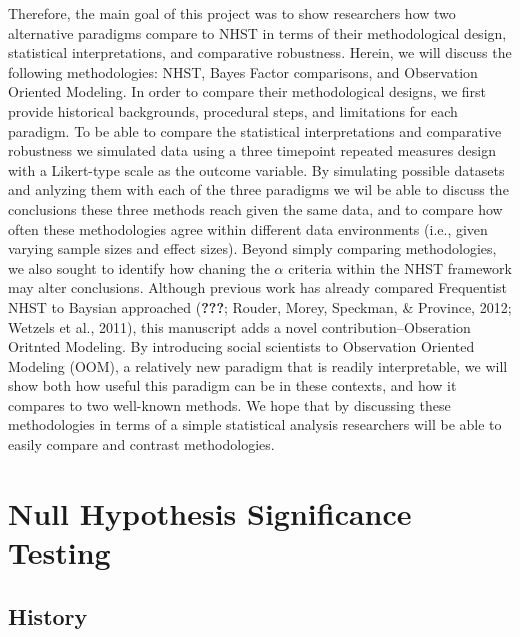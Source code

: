 \documentclass[,man, mask]{apa6}
\theoremstyle{definition}
\theoremstyle{definition}
\theoremstyle{definition}
\theoremstyle{remark}
\begin{document}
Therefore, the main goal of this project was to show researchers how two
alternative paradigms compare to NHST in terms of their methodological
design, statistical interpretations, and comparative robustness. Herein,
we will discuss the following methodologies: NHST, Bayes Factor
comparisons, and Observation Oriented Modeling. In order to compare
their methodological designs, we first provide historical backgrounds,
procedural steps, and limitations for each paradigm. To be able to
compare the statistical interpretations and comparative robustness we
simulated data using a three timepoint repeated measures design with a
Likert-type scale as the outcome variable. By simulating possible
datasets and anlyzing them with each of the three paradigms we wil be
able to discuss the conclusions these three methods reach given the same
data, and to compare how often these methodologies agree within
different data environments (i.e., given varying sample sizes and effect
sizes). Beyond simply comparing methodologies, we also sought to
identify how chaning the \(\alpha\) criteria within the NHST framework
may alter conclusions. Although previous work has already compared
Frequentist NHST to Baysian approached ({\textbf{???}}; Rouder, Morey,
Speckman, \& Province, 2012; Wetzels et al., 2011), this manuscript adds
a novel contribution--Obseration Oritnted Modeling. By introducing
social scientists to Observation Oriented Modeling (OOM), a relatively
new paradigm that is readily interpretable, we will show both how useful
this paradigm can be in these contexts, and how it compares to two
well-known methods. We hope that by discussing these methodologies in
terms of a simple statistical analysis researchers will be able to
easily compare and contrast methodologies.

\section{Null Hypothesis Significance
Testing}\label{null-hypothesis-significance-testing}

\subsection{History}\label{history}
\end{document}
